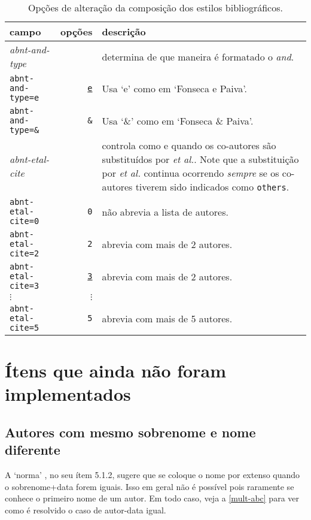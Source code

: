 \documentclass[a4paper]{ltxdoc}
\begin{document}
\begin{table}[htbp]
\caption[Opções de alteração dos estilos bibliográficos: composição]{
Opções de alteração da composição dos estilos bibliográficos.}
\label{tabela-opcoes}

\begin{center}
\begin{tabular}{lrp{8cm}}\hline\hline
campo & opções & descrição \\ \hline
\emph{abnt-and-type} & & determina de que maneira é formatado o \emph{and}.\\
{\tt abnt-and-type=e} & \underline{\tt e}& Usa `e' como em `Fonseca e Paiva'.\\
{\tt abnt-and-type=\&} & {\tt \&} & Usa `\&' como em `Fonseca \& Paiva'.
\\ \hline
\emph{abnt-etal-cite} &  & controla como e quando os co-autores são
substituídos por \emph{et al.}.  Note que a substituição
por \emph{et al.} continua ocorrendo \emph{sempre} se os co-autores tiverem sido indicados
como {\tt others}.\\
{\tt abnt-etal-cite=0}&{\tt 0}& não abrevia a lista de autores.\\
{\tt abnt-etal-cite=2}& {\tt 2} & abrevia com mais de 2 autores.\\
{\tt abnt-etal-cite=3}& \underline{\tt 3} & abrevia com mais de 2 autores.\\
$\vdots$ & $\vdots$ & \\
{\tt abnt-etal-cite=5}& {\tt 5} & abrevia com mais de 5 autores.
\\ \hline\hline
\end{tabular}
\end{center}
\end{table}


\section{Ítens que ainda não foram implementados}

\subsection{Autores com mesmo sobrenome e nome diferente}

A `norma' \cite{NBR10520:2001}, no seu ítem 5.1.2, sugere que se coloque o nome
por extenso quando o sobrenome+data forem iguais. Isso em geral não é possível
pois raramente se conhece o primeiro nome de um autor. Em todo caso, veja a
\autoref{mult-abc} para ver como é resolvido o caso de autor-data igual.
\end{document}
